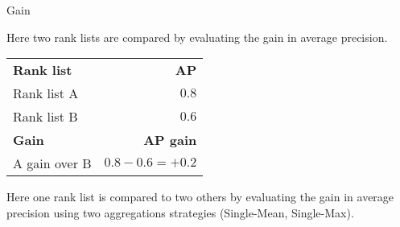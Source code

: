 \begin{example}
  \caption{Gain}
  \label{ex:gain}

  \begin{subexample}{\linewidth}
    Here two rank lists are compared by evaluating the gain in average precision.

    \vspace{0.2cm}

    \begin{center}
      \begin{tabular}{l r}
        \toprule
        \textbf{Rank list} & \textbf{AP} \\
        Rank list A & $0.8$ \\
        Rank list B & $0.6$ \\
        \midrule
        \textbf{Gain} & \textbf{AP gain} \\
        A gain over B & $0.8 - 0.6 = +0.2$ \\
        \bottomrule
      \end{tabular}
    \end{center}
  \end{subexample}

  \vspace{0.5cm}

  \begin{subexample}{\linewidth}

    Here one rank list is compared to two others by evaluating the gain in average precision using two aggregations strategies (Single-Mean, Single-Max).

    \vspace{0.2cm}

  \end{subexample}

\end{example}
